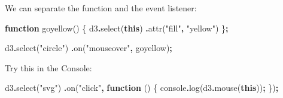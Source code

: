 \documentclass[
  openany]{book}
\newenvironment{Shaded}{\begin{snugshade}}{\end{snugshade}}
\newcommand{\BuiltInTok}[1]{#1}
\newcommand{\FunctionTok}[1]{\textcolor[rgb]{0.00,0.00,0.00}{#1}}
\newcommand{\KeywordTok}[1]{\textcolor[rgb]{0.13,0.29,0.53}{\textbf{#1}}}
\newcommand{\NormalTok}[1]{#1}
\newcommand{\OperatorTok}[1]{\textcolor[rgb]{0.81,0.36,0.00}{\textbf{#1}}}
\newcommand{\SpecialCharTok}[1]{\textcolor[rgb]{0.00,0.00,0.00}{#1}}
\newcommand{\StringTok}[1]{\textcolor[rgb]{0.31,0.60,0.02}{#1}}
\newcommand{\VerbatimStringTok}[1]{\textcolor[rgb]{0.31,0.60,0.02}{#1}}
\begin{document}
\begin{Shaded}
\end{Shaded}

We can separate the function and the event listener:

\begin{Shaded}
\begin{Highlighting}[]
\KeywordTok{function} \FunctionTok{goyellow}\NormalTok{() \{}
\NormalTok{  d3}\OperatorTok{.}\FunctionTok{select}\NormalTok{(}\KeywordTok{this}\NormalTok{)}
    \OperatorTok{.}\FunctionTok{attr}\NormalTok{(}\StringTok{"fill"}\OperatorTok{,} \StringTok{"yellow"}\NormalTok{)}
\NormalTok{    \}}\OperatorTok{;}
\end{Highlighting}
\end{Shaded}

\begin{Shaded}
\begin{Highlighting}[]
\NormalTok{d3}\OperatorTok{.}\FunctionTok{select}\NormalTok{(}\StringTok{"circle"}\NormalTok{)}
  \OperatorTok{.}\FunctionTok{on}\NormalTok{(}\StringTok{"mouseover"}\OperatorTok{,}\NormalTok{ goyellow)}\OperatorTok{;}
\end{Highlighting}
\end{Shaded}

Try this in the Console:

\begin{Shaded}
\begin{Highlighting}[]
\NormalTok{d3}\OperatorTok{.}\FunctionTok{select}\NormalTok{(}\StringTok{"svg"}\NormalTok{)}
  \OperatorTok{.}\FunctionTok{on}\NormalTok{(}\StringTok{"click"}\OperatorTok{,} \KeywordTok{function}\NormalTok{ () \{}
    \BuiltInTok{console}\OperatorTok{.}\FunctionTok{log}\NormalTok{(d3}\OperatorTok{.}\FunctionTok{mouse}\NormalTok{(}\KeywordTok{this}\NormalTok{))}\OperatorTok{;}
\NormalTok{    \})}\OperatorTok{;}
\end{Highlighting}
\end{Shaded}
\end{document}
